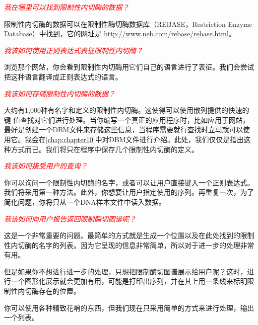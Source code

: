\textcolor{red}{\textit{我在哪里可以找到限制性内切酶的数据？}}
\begin{adjustwidth}{4em}{}
\hspace*{2em}限制性内切酶的数据可以在限制性酶切酶数据库（REBASE，Restriction Enzyme Database）中找到，它的网址是 \href{http://www.neb.com/rebase/rebase.html}{http://www.neb.com/rebase/rebase.html}。
\end{adjustwidth}

\textcolor{red}{\textit{我该如何使用正则表达式表征限制性内切酶？}}
\begin{adjustwidth}{4em}{}
\hspace*{2em}浏览那个网站，你会看到限制性内切酶用它们自己的语言进行了表征。我们会尝试把这种语言翻译成正则表达式的语言。
\end{adjustwidth}

\textcolor{red}{\textit{我该如何存储限制性内切酶的数据？}}
\begin{adjustwidth}{4em}{}
\hspace*{2em}大约有1,000种有名字和定义的限制性内切酶。这使得可以使用散列提供的快速的键-值查找对它们进行处理。当你编写一个真正的应用程序时，比如应用于网站，最好是创建一个DBM文件来存储这些信息，当程序需要就行查找时立马就可以使用它。我会在\autoref{chap:chapter10}中对DBM文件进行介绍。此处，我们仅仅是指出这种方式而已。我们将只在程序中保存几个限制性内切酶的定义。
\end{adjustwidth}

\textcolor{red}{\textit{我该如何接受用户的查询？}}
\begin{adjustwidth}{4em}{}
\hspace*{2em}你可以询问一个限制性内切酶的名字，或者可以让用户直接键入一个正则表达式。我们将采用第一种方法。此外，你想要让用户指定使用的序列。再重复一次，为了简化问题，你将只从一个DNA样本文件中读入数据。
\end{adjustwidth}

\textcolor{red}{\textit{我该如何向用户报告返回限制酶切图谱呢？}}
\begin{adjustwidth}{4em}{}
\hspace*{2em}这是一个非常重要的问题。最简单的方式就是生成一个位置以及在此处找到的限制性内切酶的名字的列表。因为它呈现的信息非常简单，所以对于进一步的处理非常有用。

但是如果你不想进行进一步的处理，只想把限制酶切图谱展示给用户呢？这时，进行一个图形化展示就会更加有用，可能是打印出序列，并在其上用一条线来标明限制性内切酶存在的位置。

你可以使用各种精致花哨的东西，但我们现在只采用简单的方式来进行处理，输出一个列表。
\end{adjustwidth}

